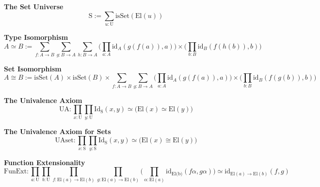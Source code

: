 \textbf{The Set Universe}
$$\text{S} := \sum_{u : \text{U}} \text{isSet}(\text{El}(u))$$

\textbf{Type Isomorphism}
$$A \simeq B := \sum_{f :A \to B}\sum_{g :B \to A}\sum_{h :B \to A}\Big(\prod_{a : A} \text{id}_{A}(g(f(a)),a) \Big) \times \Big(\prod_{b : B} \text{id}_{B}(f(h(b)),b) \Big)$$

\textbf{Set Isomorphism}
$$A \cong B := \text{isSet}(A) \times \text{isSet}(B)\times\sum_{f :A \to B}\sum_{g :B \to A}\Big(\prod_{a : A} \text{id}_{A}(g(f(a)),a) \Big) \times \Big(\prod_{b : B} \text{id}_{B}(f(g(b)),b) \Big)$$

\textbf{The Univalence Axiom}
$$\text{UA}: \prod_{x : \text{U}} \prod_{y : \text{U}} \text{Id}_{\text{S}}(x,y) \simeq \Big(\text{El}(x) \simeq \text{El}(y)\Big)$$

\textbf{The Univalence Axiom for Sets}
$$\text{UAset}: \prod_{x : \text{S}} \prod_{y : \text{S}} \text{Id}_{\text{S}}(x,y) \simeq \Big(\text{El}(x) \cong \text{El}(y)\Big)$$

\textbf{Function Extensionality}
$$\text{FunExt}: \prod_{a : \text{U}} \prod_{b : \text{U}} \prod_{f : \text{El}(a) \to \text{El}(b)} \prod_{g : \text{El}(a) \to \text{El}(b)}\Big( \prod_{\alpha : \text{El}(a)}\text{id}_{\text{El(b)}}(f\alpha,g\alpha)\Big) \simeq \text{id}_{\text{El}(a) \to \text{El}(b)}(f,g)$$
